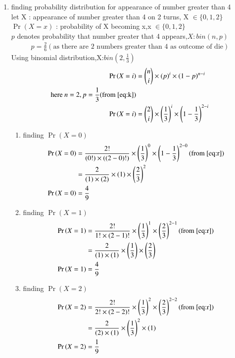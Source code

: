 \documentclass[journal,12pt,onecolumn]{IEEEtran}
\providecommand{\pr}[1]{\ensuremath{\Pr\left(#1\right)}}
\providecommand{\brak}[1]{\ensuremath{\left(#1\right)}}
\theoremstyle{remark}
\begin{document}
\begin{enumerate}
\item finding probability distribution for appearance of number greater than 4\\
let X : appearance of number greater than 4 on 2 turns,
X $\in \{ 0,1,2 \}$ \\
$\pr{X=x}$ : probability of X becoming x,x $\in \{ 0,1,2 \}$
\\
$p$ denotes probability that number greater that 4 appears,$X:bin(n,p)$ 
\begin{align}
p=\frac{2}{6}(\text{as there are 2 numbers greater than  4 as outcome of die})\label{eq:k} 
\end{align}
Using binomial distribution,X:$bin(2,\frac{1}{3})$
\begin{align}
\pr{X=i}&={n \choose i}\times(p)^i\times(1-p)^{n-i}\\
\text{here } n=2,p=\frac{1}{3}  (\text{from } \eqref{eq:k})\\
\pr{X=i}&={2 \choose i}\times \brak{\frac{1}{3}}^i\times\brak{1-\frac{1}{3}}^{2-i} \label{eq:r}
\end{align}
\begin{enumerate}
\item finding $\pr{X=0}$
\begin{align}
\pr{X=0}&=\frac{2!}{(0!)\times((2-0)!)}\times\brak{\frac{1}{3}}^0\times\brak{1-\frac{1}{3}}^{2-0} (\text{from } \eqref{eq:r})\\
&= \frac{2}{(1)\times(2)}\times(1)\times\brak{\frac{2}{3}}^{2}    \\
\pr{X=0}&=\frac{4}{9}
\end{align}
\item finding $\pr{X=1}$
\begin{align}
\pr{X=1}&=\frac{2!}{1!\times(2-1)!}\times\brak{\frac{1}{3}}^{1}\times\brak{\frac{2}{3}}^{2-1}(\text{from } \eqref{eq:r})\\
&=\frac{2}{(1)\times(1)}\times\brak{\frac{1}{3}}\times\brak{\frac{2}{3}}\\
\pr{X=1}&=\frac{4}{9}
\end{align}
\item finding $\pr{X=2}$
\begin{align}
\pr{X=2}&=\frac{2!}{2!\times(2-2)!}\times\brak{\frac{1}{3}}^{2}\times\brak{\frac{2}{3}}^{2-2}(\text{from } \eqref{eq:r})\\
&= \frac{2}{(2)\times(1)}\times\brak{\frac{1}{3}}^{2}\times(1)    \\
\pr{X=2}&=\frac{1}{9}
\end{align}

\end{enumerate}
\end{enumerate}
\end{document}
